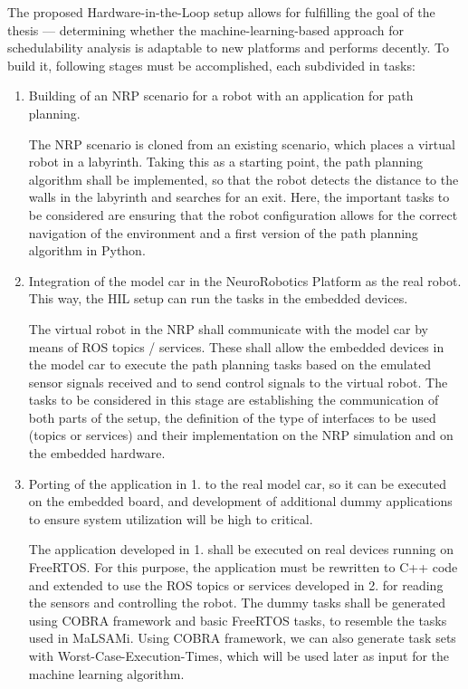 The proposed Hardware-in-the-Loop setup allows for fulfilling the goal of the thesis --- determining whether the machine-learning-based approach for schedulability analysis is adaptable to new platforms and performs decently. To build it, following stages must be accomplished, each subdivided in tasks:
\begin{enumerate}
\item	Building of an NRP scenario for a robot with an application for path planning.

The NRP scenario is cloned from an existing scenario, which places a virtual robot in a labyrinth. Taking this as a starting point, the path planning algorithm shall be implemented, so that the robot detects the distance to the walls in the labyrinth and searches for an exit. Here, the important tasks to be considered are ensuring that the robot configuration allows for the correct navigation of the environment and a first version of the path planning algorithm in Python.

\item	Integration of the model car in the NeuroRobotics Platform as the real robot. This way, the HIL setup can run the tasks in the embedded devices.

The virtual robot in the NRP shall communicate with the model car by means of ROS topics / services. These shall allow the embedded devices in the model car to execute the path planning tasks based on the emulated sensor signals received and to send control signals to the virtual robot. The tasks to be considered in this stage are establishing the communication of both parts of the setup, the definition of the type of interfaces to be used (topics or services) and their implementation on the NRP simulation and on the embedded hardware.

\item	Porting of the application in 1. to the real model car, so it can be executed on the embedded board, and development of additional dummy applications to ensure system utilization will be high to critical.

The application developed in 1. shall be executed on real devices running on FreeRTOS. For this purpose, the application must be rewritten to C++ code and extended to use the ROS topics or services developed in 2. for reading the sensors and controlling the robot. The dummy tasks shall be generated using COBRA framework and basic FreeRTOS tasks, to resemble the tasks used in MaLSAMi. Using COBRA framework, we can also generate task sets with Worst-Case-Execution-Times, which will be used later as input for the machine learning algorithm.


\end{enumerate}
